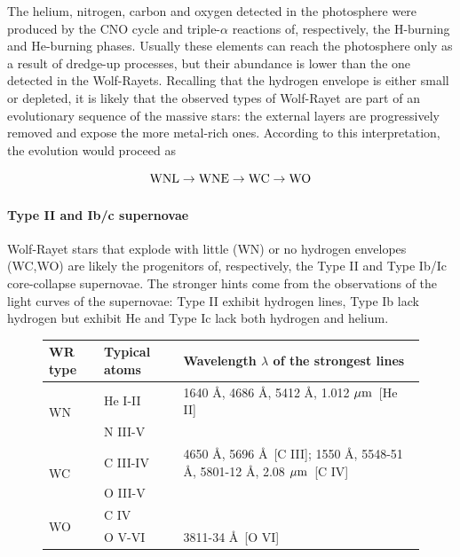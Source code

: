 \documentclass[a4paper,titlepage]{book}     	%
\begin{document}
The helium, nitrogen, carbon and oxygen detected in the photosphere were produced by the CNO cycle and triple-$\alpha$ reactions of, respectively, the H-burning and He-burning phases. Usually these elements can reach the photosphere only as a result of dredge-up processes, but their abundance is lower than the one detected in the Wolf-Rayets. Recalling that the hydrogen envelope is either small or depleted, it is likely that the observed types of Wolf-Rayet are part of an evolutionary sequence of the massive stars: the external layers are progressively removed and expose the more metal-rich ones. According to this interpretation, the evolution would proceed as

\[\rm WNL \rightarrow WNE \rightarrow WC \rightarrow WO\]

\paragraph{Type II and Ib/c supernovae} Wolf-Rayet stars that explode with little (WN) or no hydrogen envelopes (WC,WO) are likely the progenitors of, respectively, the Type II and Type Ib/Ic core-collapse supernovae. The stronger hints come from the observations of the light curves of the supernovae: Type II exhibit hydrogen lines, Type Ib lack hydrogen but exhibit He and Type Ic lack both hydrogen and helium. \cite{WR_signature,parsec2015_chen,Limongi2010_preSNevo}

\renewcommand{\arraystretch}{1.5}
\begin{figure}[h]
	\centering
		\begin{tabular}{lll}
			\toprule
			WR type & Typical atoms & Wavelength $\lambda$ of the strongest lines \\
			\midrule
			\multirow{2}{*}{WN}  & He I-II  & 1640 \AA , 4686 \AA, 5412 \AA, 1.012 $\mu\rm m$~[He II] \\
			& N III-V & \\ 
			\hline
			\multirow{2}{*}{WC}  & C III-IV  & 4650 \AA, 5696 \AA ~[C III]; 1550 \AA,  5548-51 \AA, 5801-12 \AA, 2.08 $\mu\rm m$~[C IV] \\
			& O III-V & \\
			\hline
			\multirow{2}{*}{WO}  & C IV  &\\
			& O V-VI & 3811-34 \AA~[O VI]\\
			\bottomrule 	
		\end{tabular}
		 \label{tab:WRclassification}
\end{figure}
\end{document}
